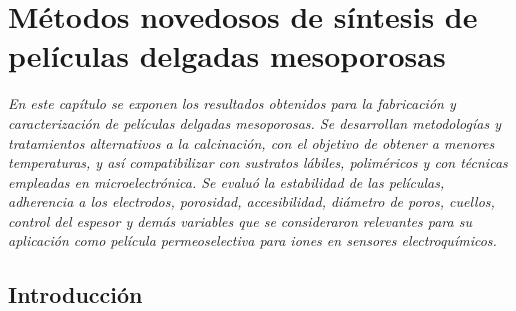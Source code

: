  \newcommand{\NoBiblioMeso}[1]{
 \ifthenelse{\equal{#1}{verdadero}}{}{}
 \NoBiblioMeso{verdadero}}

 
 \FormatoCapituloDosLineas
 
 \chapter{Métodos novedosos de síntesis de películas delgadas mesoporosas}
 \label{chap:Mesoporosos}

 \thispagestyle{empty}
	
 \noindent\textit{En este capítulo se exponen los resultados obtenidos para la fabricación y caracterización de películas delgadas mesoporosas. Se desarrollan metodologías y tratamientos alternativos a la calcinación, con el objetivo de obtener \pdm\space a menores temperaturas, y así compatibilizar con sustratos lábiles, poliméricos y con técnicas empleadas en microelectrónica. Se evaluó la estabilidad de las películas, adherencia a los electrodos, porosidad, accesibilidad, diámetro de poros, cuellos, control del espesor y demás variables que se consideraron relevantes para su aplicación como película permeoselectiva para iones en sensores electroquímicos.}
 
 \vfill
 \minitoc
 \newpage

\section{Introducción}


